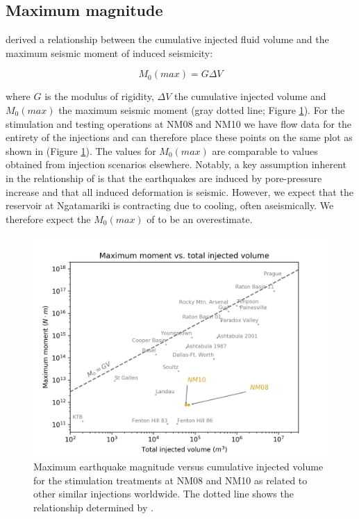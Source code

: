 \subsection{Maximum magnitude}\label{mmax}
\citet{mcgarr2014maximum} derived a relationship between the cumulative injected fluid volume and the maximum seismic moment of induced seismicity:

\begin{equation}
    M_{0}(max) = G\Delta{V}
\end{equation}

where $G$ is the modulus of rigidity, $\Delta{V}$ the cumulative injected volume and $M_{0}(max)$ the maximum seismic moment (gray dotted line; Figure \ref{Mmax}). For the \gls{stimulation} and testing operations at NM08 and NM10 we have flow data for the entirety of the injections and can therefore place these points on the same plot as shown in \citet[][and others]{mcgarr2014maximum,Goebel_2018} (Figure \ref{Mmax}). The values for $M_{0}(max)$ are comparable to values obtained from injection scenarios elsewhere. Notably, a key assumption inherent in the relationship of \citet{mcgarr2014maximum} is that the earthquakes are induced by pore-pressure increase and that all induced deformation is seismic. However, we expect that the reservoir at Ngatamariki is contracting due to cooling, often aseismically. We therefore expect the $M_{0}(max)$ of \citet{mcgarr2014maximum} to be an overestimate.

\begin{figure}[h!]
\begin{center}
\includegraphics[width=1.00\columnwidth]{Chapter_3_Nga/figures/Mmax_cumulative_volume/Nga_stimulations_Mmax_vs_vol_w_McGarr_3-18}
\caption[Maximum magnitude versus cumulative injected volume]{{
Maximum earthquake magnitude versus cumulative injected volume for the \gls{stimulation} treatments at NM08 and NM10 as related to other similar injections worldwide. The dotted line shows the relationship determined by \citet{mcgarr2014maximum}.
{\label{Mmax}}%
}}
\end{center}
\end{figure}

